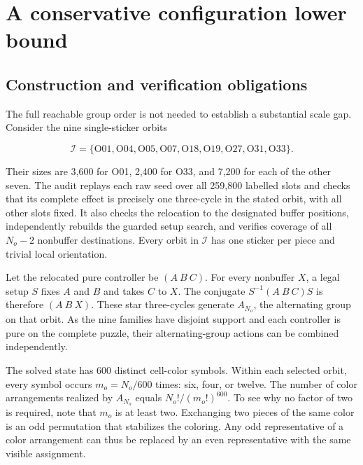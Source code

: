 \documentclass[a4paper,11pt]{article}
\begin{document}
\section{A conservative configuration lower bound}
\label{sec:4}

\subsection{Construction and verification obligations}

The full reachable group order is not needed to establish a substantial scale gap. Consider the nine single-sticker orbits

\begin{equation}
\mathcal{I}=\{\mathrm{O01},\mathrm{O04},\mathrm{O05},\mathrm{O07},\mathrm{O18},\mathrm{O19},\mathrm{O27},\mathrm{O31},\mathrm{O33}\}.
\label{eq:orbits}
\end{equation}

Their sizes are 3,600 for O01, 2,400 for O33, and 7,200 for each of the other seven. The audit replays each raw seed over all 259,800 labelled slots and checks that its complete effect is precisely one three-cycle in the stated orbit, with all other slots fixed. It also checks the relocation to the designated buffer positions, independently rebuilds the guarded setup search, and verifies coverage of all \(N_o-2\) nonbuffer destinations. Every orbit in \(\mathcal{I}\) has one sticker per piece and trivial local orientation.

Let the relocated pure controller be \((A\ B\ C)\). For every nonbuffer \(X\), a legal setup \(S\) fixes \(A\) and \(B\) and takes \(C\) to \(X\). The conjugate \(S^{-1}(A\ B\ C)S\) is therefore \((A\ B\ X)\). These star three-cycles generate \(A_{N_o}\), the alternating group on that orbit. As the nine families have disjoint support and each controller is pure on the complete puzzle, their alternating-group actions can be combined independently.

The solved state has 600 distinct cell-color symbols. Within each selected orbit, every symbol occurs \(m_o=N_o/600\) times: six, four, or twelve. The number of color arrangements realized by \(A_{N_o}\) equals \(N_o!/(m_o!)^{600}\). To see why no factor of two is required, note that \(m_{o}\) is at least two. Exchanging two pieces of the same color is an odd permutation that stabilizes the coloring. Any odd representative of a color arrangement can thus be replaced by an even representative with the same visible assignment.
\end{document}
